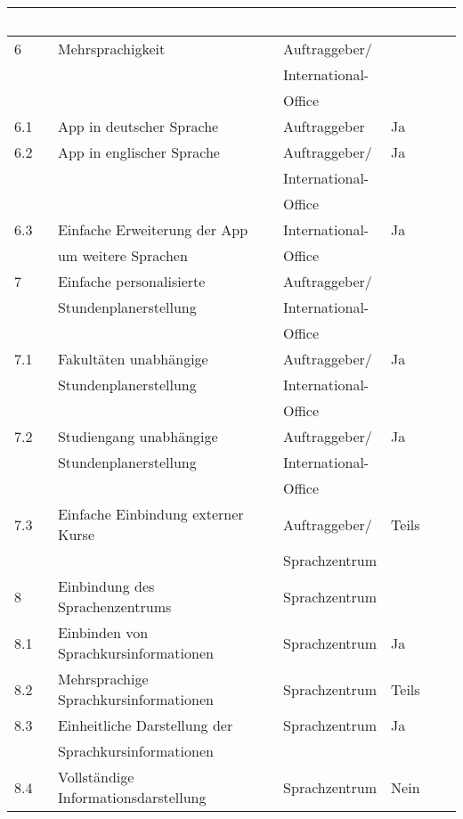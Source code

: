 \begin{table}[H]
\begin{center}
  \begin{tabular}{| l | l | l | l |}
  
\hline
\rowcolor{Gray}
\textcolor{white}{\textbf{Ref.}} & \textcolor{white}{\textbf{Anforderungen}} & \textcolor{white}{\textbf{Quelle}} & \textcolor{white}{\textbf{Erledigt}} \\

\hline    
\rowcolor{LGray} 						
6		& Mehrsprachigkeit									& Auftraggeber/		& \\ \rowcolor{LGray}
		&													& International-	&\\ \rowcolor{LGray}
		&													& Office			&\\ 
\hline
6.1		& App in deutscher Sprache							& Auftraggeber 		& Ja\\
\hline
6.2		& App in englischer Sprache 						& Auftraggeber/		& Ja\\
		&													& International-	&\\
		&													& Office 			&\\
\hline
6.3		& Einfache Erweiterung der App 						& International-	& Ja\\
		& um weitere Sprachen								& Office 			&\\
\hline

\hline
\rowcolor{LGray} 						
7		& Einfache personalisierte 							& Auftraggeber/		&\\ \rowcolor{LGray}
		& Stundenplanerstellung  							& International-	&\\ \rowcolor{LGray}
		&													& Office			&\\
\hline
7.1		& Fakultäten unabhängige 							& Auftraggeber/		& Ja\\
		& Stundenplanerstellung								& International-	&\\
		&													& Office 			&\\ 
\hline
7.2		& Studiengang unabhängige					 		& Auftraggeber/		& Ja\\
		& Stundenplanerstellung								& International-	&\\
		&													& Office			&\\
\hline
7.3		& Einfache Einbindung externer Kurse				& Auftraggeber/		& Teils\\
		&													& Sprachzentrum	    &\\
\hline    

\hline
\rowcolor{LGray} 						
8		& Einbindung des Sprachenzentrums 						& Sprachzentrum &\\
\hline
8.1		& Einbinden von Sprachkursinformationen					& Sprachzentrum &Ja\\
\hline
8.2		& Mehrsprachige Sprachkursinformationen					& Sprachzentrum &Teils\\
\hline
8.3		& Einheitliche Darstellung der 							& Sprachzentrum &Ja\\
		& Sprachkursinformationen								& 				&\\
\hline
8.4		& Vollständige Informationsdarstellung					& Sprachzentrum & Nein\\
\hline


\end{tabular}
\end{center}
\end{table}
